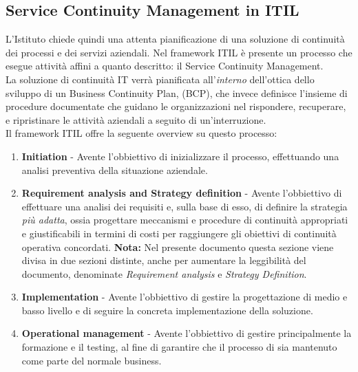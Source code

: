 \subsection{Service Continuity Management in ITIL}
L'Istituto chiede quindi una attenta pianificazione di una soluzione di continuità dei processi e dei servizi aziendali. Nel framework ITIL è presente un processo che esegue attività affini a quanto descritto: il Service Continuity Management.
\\ La soluzione di continuità IT verrà pianificata all'\textit{interno} dell'ottica dello sviluppo di un Business Continuity Plan, (BCP), che invece definisce l'insieme di procedure documentate che guidano le organizzazioni nel rispondere, recuperare, e ripristinare le attività aziendali a seguito di un'interruzione.
\vspace{2cm} \\
Il framework ITIL offre la seguente overview su questo processo:
\begin{enumerate}
\item \textbf{Initiation} - Avente l'obbiettivo di inizializzare il processo, effettuando una analisi preventiva della situazione aziendale. 
\item \textbf{Requirement analysis and Strategy definition} - Avente l'obbiettivo di effettuare una analisi dei requisiti e, sulla base di esso, di definire la strategia \textit{più adatta}, ossia progettare meccanismi e procedure di continuità appropriati e giustificabili in termini di costi per raggiungere gli obiettivi di continuità operativa concordati. \textbf{Nota: }Nel presente documento questa sezione viene divisa in due sezioni distinte, anche per aumentare la leggibilità del documento, denominate \textit{Requirement analysis} e \textit{Strategy Definition}.
\item \textbf{Implementation} - Avente l'obbiettivo di gestire la progettazione di medio e basso livello e di seguire la concreta implementazione della soluzione.
\item \textbf{Operational management} - Avente l'obbiettivo di gestire principalmente la formazione e il testing, al fine di garantire che il processo di sia mantenuto come parte del normale business.
\end{enumerate}

